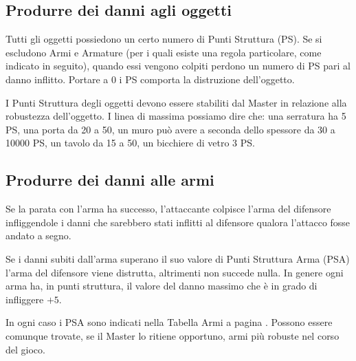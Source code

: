 

\iffullversion
{\raggedright \subsection{Produrre dei danni agli oggetti}}

Tutti gli oggetti possiedono un certo numero di Punti Struttura (PS).
Se si escludono Armi e Armature (per i quali esiste una regola
particolare, come indicato in seguito), quando essi vengono colpiti
perdono un numero di PS pari al danno inflitto. Portare a 0 i PS
comporta la distruzione dell'oggetto.

I Punti Struttura degli oggetti devono essere stabiliti
dal Master in relazione alla robustezza dell'oggetto. I linea di massima possiamo
dire che: una serratura ha 5 PS, una porta da 20 a 50, un muro pu\`o avere
a seconda dello spessore da 30 a 10000 PS, un tavolo da 15 a 50, un bicchiere
di vetro 3 PS.

\subsection{Produrre dei danni alle armi}
\label{danniarmi}

Se la parata con l'arma ha successo, l'attaccante colpisce l'arma del
difensore infliggendole i danni che sarebbero stati inflitti al
difensore qualora l'attacco fosse andato a segno.

Se i danni subiti dall'arma superano il suo valore di Punti Struttura Arma (PSA)
l'arma del difensore viene distrutta, altrimenti non succede nulla. In genere
ogni arma ha, in punti struttura, il valore del danno massimo che \`e in grado
di infliggere $+5$. 

In ogni caso i PSA sono indicati nella Tabella Armi a pagina
\pageref{tabarmi}. Possono essere comunque trovate, se il Master lo
ritiene opportuno, armi pi\`u robuste nel corso del gioco.

